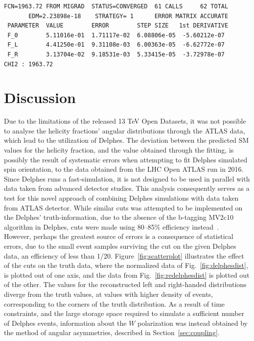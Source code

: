 \documentclass[12pt,a4paper]{article}
\numberwithin{equation}{section}
\begin{document}
\begin{verbatim}
FCN=1963.72 FROM MIGRAD  STATUS=CONVERGED  61 CALLS     62 TOTAL
       EDM=2.23898e-18    STRATEGY= 1      ERROR MATRIX ACCURATE
 PARAMETER  VALUE        ERROR        STEP SIZE   1st DERIVATIVE
 F_0        5.11016e-01  1.71117e-02  6.08806e-05  -5.60212e-07
 F_L        4.41250e-01  9.31108e-03  6.00363e-05  -6.62772e-07
 F_R        3.13704e-02  9.18531e-03  5.33415e-05  -3.72978e-07
CHI2 : 1963.72
\end{verbatim}


\section{Discussion}
Due to the limitations of the released 13 TeV Open Datasets, it was not possible
to analyse the helicity fractions' angular distributions through the ATLAS data,
which lead to the utilization of Delphes. The deviation between the predicted SM
values for the helicity fraction, and the value obtained through the fitting, is
possibly the result of systematic errors when attempting to fit Delphes
simulated spin orientation, to the data obtained from the LHC Open ATLAS run in
2016. Since Delphes runs a fast-simulation, it is not designed to be used in
parallel with data taken from advanced detector studies. This analysis
consequently serves as a test for this novel approach of combining Delphes
simulations with data taken from ATLAS detector. While similar cuts was
attempted to be implemented on the Delphes' truth-information, due to the
absence of the b-tagging MV2c10 algorithm in Delphes, cuts were made using
80--85\% efficiency instead~\cite{CMS-PAS-BTV-11-004}.\\

However, perhaps the greatest source of errors is a consequence of statistical
errors, due to the small event samples surviving the cut on the given Delphes
data, an efficiency of less than 1/20. Figure~\ref{fig:scatterplot} illustrates
the effect of the cuts on the truth data, where the normalized data of
Fig.~\ref{fig:delphesdist}, is plotted out of one axis, and the data from
Fig.~\ref{fig:redelphesdist} is plotted out of the other. The values for the
reconstructed left and right-handed distributions diverge from the truth values,
at values with higher density of events, corresponding to the corners of the
truth distribution. As a result of time constraints, and the large storage space
required to simulate a sufficient number of Delphes events, information about
the $W$ polarization was instead obtained by the method of angular asymmetries,
described in Section~\ref{sec:coupling}.\\
\end{document}
